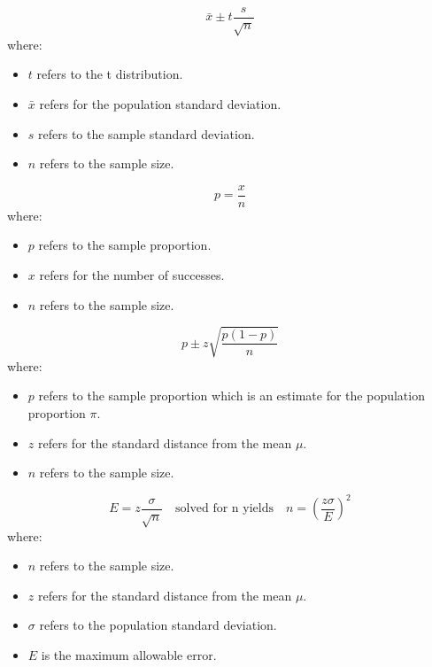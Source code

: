 \begin{equation}
\label{Confidence interval for a population mean with sigma unknown}
\bar{x} \pm t \frac{s}{\sqrt{n}}
\end{equation}
where: 
\begin{itemize}
 \item $t$ refers to the t distribution.
 \item $\bar{x}$ refers for the population standard deviation.
 \item $s$ refers to the sample standard deviation.
 \item $n$ refers to the sample size. 
\end{itemize}
\hformbar


\begin{equation}
\label{sample proportion}
p = \frac{x}{n}
\end{equation}
where: 
\begin{itemize}
 \item $p$ refers to the sample proportion.
 \item $x$ refers for the number of successes.
 \item $n$ refers to the sample size. 
\end{itemize}
\hformbar


\begin{equation}
\label{confidence interval for a population proportion}
p \pm z \sqrt{\frac{p(1-p)}{n}}
\end{equation}
where: 
\begin{itemize}
 \item $p$ refers to the sample proportion which is an estimate for the population proportion $\pi$.
 \item $z$ refers for the standard distance from the mean $\mu$.
 \item $n$ refers to the sample size. 
\end{itemize}
\hformbar


\begin{equation}
\label{sample size for estimating the population mean}
E = z\frac{\sigma}{\sqrt{n}} \quad\text{solved for n yields}\quad n = (\frac{z\sigma}{E})^2
\end{equation}
where: 
\begin{itemize}
 \item $n$ refers to the sample size. 
 \item $z$ refers for the standard distance from the mean $\mu$.
 \item $\sigma$ refers to the population standard deviation.
 \item $E$ is the maximum allowable error. 
\end{itemize}
\hformbar


